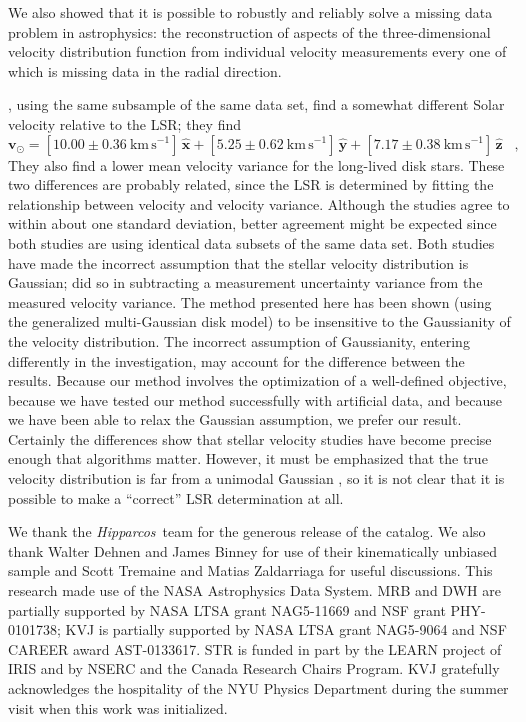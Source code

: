 \documentclass[12pt,preprint]{aastex}
\newcommand{\Hipparcos}{\textit{Hipparcos}}
\renewcommand{\vec}[1]{\mathbf{#1}} %
\newcommand{\vv}{\vec{v}}
\newcommand{\eex}{\vec{\hat{x}}}
\newcommand{\eey}{\vec{\hat{y}}}
\newcommand{\eez}{\vec{\hat{z}}}
\newcommand{\vvsun}{\vv_\odot}
\begin{document}
We also showed that it is possible to robustly and reliably solve a
missing data problem in astrophysics: the reconstruction of aspects of
the three-dimensional velocity distribution function from individual
velocity measurements every one of which is missing data in the radial
direction.

\citet{dehnen98a}, using the same subsample of the same data set, find
a somewhat different Solar velocity relative to the LSR; they find
\begin{equation}
\vvsun = [10.00\pm0.36~\mathrm{km\,s^{-1}}]\,\eex
       + [ 5.25\pm0.62~\mathrm{km\,s^{-1}}]\,\eey
       + [ 7.17\pm0.38~\mathrm{km\,s^{-1}}]\,\eez \;\;\;,
\end{equation}
They also find a lower mean velocity variance for the long-lived disk
stars.  These two differences are probably related, since the LSR is
determined by fitting the relationship between velocity and velocity
variance.  Although the studies agree to within about one standard
deviation, better agreement might be expected since both studies are
using identical data subsets of the same data set.  Both studies have
made the incorrect assumption that the stellar velocity distribution
is Gaussian; \citet{dehnen98a} did so in subtracting a measurement
uncertainty variance from the measured velocity variance.  The method
presented here has been shown (using the generalized multi-Gaussian
disk model) to be insensitive to the Gaussianity of the velocity
distribution.  The incorrect assumption of Gaussianity, entering
differently in the \citet{dehnen98a} investigation, may account for
the difference between the results.  Because our method involves the
optimization of a well-defined objective, because we have tested our
method successfully with artificial data, and because we have been
able to relax the Gaussian assumption, we prefer our result.
Certainly the differences show that stellar velocity studies have
become precise enough that algorithms matter.  However, it must be
emphasized that the true velocity distribution is far from a unimodal
Gaussian \citep{dehnen98b, skuljan99a, chereul98a}, so it is not clear
that it is possible to make a ``correct'' LSR determination at all.

\acknowledgments We thank the \Hipparcos\ team for the generous
release of the catalog.  We also thank Walter Dehnen and James Binney
for use of their kinematically unbiased sample and Scott Tremaine and
Matias Zaldarriaga for useful discussions.  This research made use of
the NASA Astrophysics Data System.  MRB and DWH are partially
supported by NASA LTSA grant NAG5-11669 and NSF grant PHY-0101738; KVJ
is partially supported by NASA LTSA grant NAG5-9064 and NSF CAREER
award AST-0133617.  STR is funded in part by the LEARN project of IRIS
and by NSERC and the Canada Research Chairs Program.  KVJ gratefully
acknowledges the hospitality of the NYU Physics Department during the
summer visit when this work was initialized.
\end{document}
